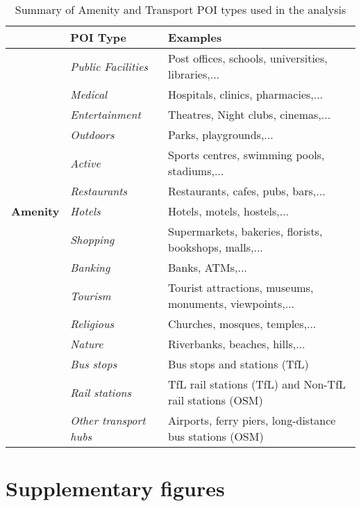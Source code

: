 \begin{table}[ht]
    \centering
    \renewcommand{\arraystretch}{1.1}
    \begin{tabular}{|l|l|l|}
        \hline
        \rowcolor{lightgray}
        & \textbf{POI Type} & \textbf{Examples} \\
        \hline
        \multirow{13}{*}{\textbf{Amenity}}
            &\textit{Public Facilities} & Post offices, schools, universities, libraries,... \\
            &\textit{Medical} & Hospitals, clinics, pharmacies,... \\
            &\textit{Entertainment} & Theatres, Night clubs, cinemas,... \\
            &\textit{Outdoors} & Parks, playgrounds,... \\
            &\textit{Active} & Sports centres, swimming pools, stadiums,... \\
            &\textit{Restaurants} & Restaurants, cafes, pubs, bars,... \\
            &\textit{Hotels} & Hotels, motels, hostels,... \\
            &\textit{Shopping} & Supermarkets, bakeries, florists, bookshops, malls,... \\
            &\textit{Banking} & Banks, ATMs,... \\
            &\textit{Tourism} & Tourist attractions, museums, monuments, viewpoints,... \\
            &\textit{Religious} & Churches, mosques, temples,... \\
            &\textit{Nature} & Riverbanks, beaches, hills,... \\
        \hline
        \multirow{3}{*}{\textbf{Transport}}
            &\textit{Bus stops} & Bus stops and stations (TfL) \\
            &\textit{Rail stations} & TfL rail stations (TfL) and Non-TfL rail stations (OSM) \\
            &\textit{Other transport hubs} & Airports, ferry piers, long-distance bus stations (OSM) \\
        \hline
    \end{tabular}
    \caption{Summary of Amenity and Transport POI types used in the analysis}
    \label{tab:osmpoi}
\end{table}

\section{Supplementary figures}

